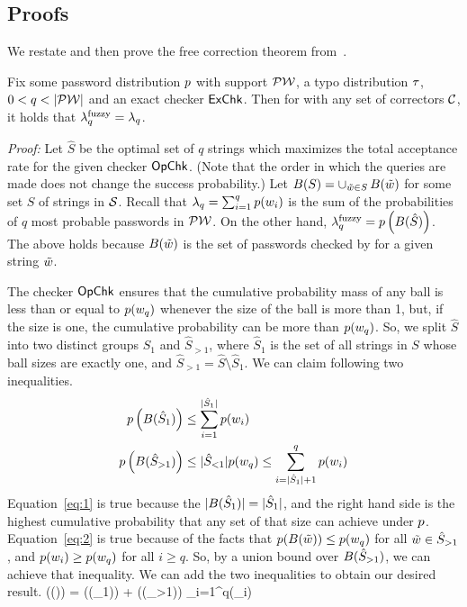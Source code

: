 \subsection{Proofs}
\label{app:proofs}

We restate and then prove the free correction theorem from~. 

\setcounter{theorem}{0}
\begin{theorem} Fix some password
  distribution $p$ with support $\mathcal{PW}$, a typo distribution
  $\tau$, $0<q<|\PW|$ and an exact checker $\textnormal{\textsf{ExChk}}$.
Then for \opchecker with any set of correctors ${\mathcal C}$, it 
holds that $\lambda^\textnormal{fuzzy}_q = \lambda_q$. 
\label{thm:free_corr2}
\end{theorem}

\noindent\emph{Proof:}
Let $\hat{S}$ be the optimal set of $q$ strings which maximizes the
total acceptance rate for the given checker $\textnormal{\textsf{OpChk}}$.  (Note that
the order in which the queries are made does not change the success
probability.)  Let
$B(S) = \mathop{\cup}_{\tilde{w}\in S} B(\tilde{w})$ for some set
$S$ of strings in $\mathcal{S}$.  Recall that
$\lambda_q = \sum_{i=1}^{q} p({w}_i)$ is the sum of the
probabilities of $q$ most probable passwords in $\mathcal{PW}$. On the other
hand, $\lambda^\textnormal{fuzzy}_q = p\left(B(\hat{S})\right)$.  The above
holds because $B(\tilde{w})$ is the set of passwords checked by
\opchecker for a given string $\tilde{w}$.


The checker $\textnormal{\textsf{OpChk}}$ ensures that the cumulative probability mass of
any ball is less than or equal to $p({w}_q)$ whenever the size
of the ball is more than 1, but, if the size is one, the cumulative
probability can be more than $p({w}_q)$.  So, we split $\hat{S}$
into two distinct groups $\hat{S}_1$ and
$\hat{S}_{>1}$, where $\hat{S}_1$ is the set of all strings in $S$
whose ball sizes are exactly one, and
$\hat{S}_{>1} = \hat{S}\setminus \hat{S}_1$.  We can claim following two
inequalities.
\begin{align}
  \label{eq:1}
  \pwprob\left(\ball(\hat{S}_1)\right) &\le \sum_{i=1}^{|\hat{S}_1|}\pwprob(\pw_i)\\
  \label{eq:2}
 \pwprob\left(\ball(\hat{S}_{>1})\right)&\le |\hat{S}_{<1}|\pwprob(\pw_q)  \le \sum_{i=|\hat{S}_1|+1}^{q}\pwprob(\pw_i)
\end{align}
Equation~\eqref{eq:1} is true because the
$|B(\hat{S}_1)|=|\hat{S}_1|$, and the right hand side is the
highest cumulative probability that any set of that size can achieve under
$p$.  Equation~\eqref{eq:2} is true because of the facts that $p(B(\tilde{w}))\le p({w}_q)$  for all $\tilde{w}\in\hat{S}_{>1}$, and $p({w}_i)\ge p({w}_q)$ for all $i\ge q$. 
So, by a union bound over $B(\hat{S}_{>1})$,  we can achieve that inequality. 
We can add the two inequalities to obtain our  desired result.
\bnm \pwprob\left(\ball()\right) = \pwprob\left(\ball(_1)\right)  + \pwprob\left(\ball(_{>1})\right) \le  \sum_{i=1}^q\pwprob(\pw_i)
\enm

